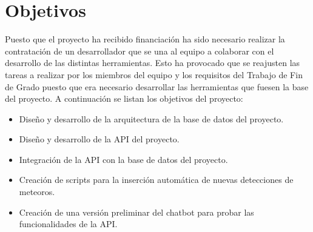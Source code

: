 \vspace{0.5cm}



\section{Objetivos}

Puesto que el proyecto ha recibido financiación ha sido necesario realizar la contratación de un desarrollador que se una al equipo a colaborar con el desarrollo de las distintas herramientas. Esto ha provocado que se reajusten las tareas a realizar por los miembros del equipo y  los requisitos del Trabajo de Fin de Grado puesto que era necesario desarrollar las herramientas que fuesen la base del proyecto. A continuación se listan los objetivos del proyecto:



\begin{itemize}
    \item Diseño y desarrollo de la arquitectura de la base de datos del proyecto.
    \item Diseño y desarrollo de la API del proyecto.
    \item Integración de la API con la base de datos del proyecto.
    \item Creación de scripts para la inserción automática de nuevas detecciones de meteoros.
    \item Creación de una versión preliminar del chatbot para probar las funcionalidades de la API.
\end{itemize}

